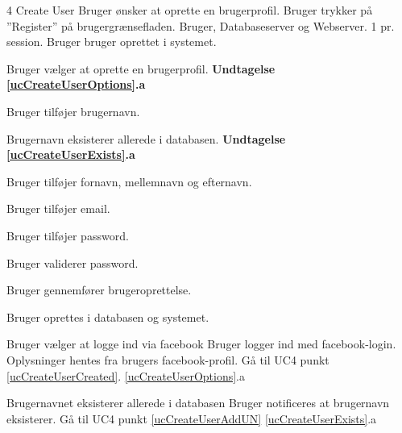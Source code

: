 
\uchead
	{4}
	{Create User}
	{Bruger ønsker at oprette en brugerprofil.}
	{Bruger trykker på ''Register'' på brugergrænsefladen.}
	{Bruger, Databaseserver og Webserver.}
	{}
	{1 pr. session.}
	{Bruger bruger oprettet i systemet.}

\item \label{ucCreateUserOptions} Bruger vælger at oprette en brugerprofil. \newline
\textbf{Undtagelse \ref{ucCreateUserOptions}.a}

\item \label{ucCreateUserAddUN} Bruger tilføjer brugernavn.

\item \label{ucCreateUserExists} Brugernavn eksisterer allerede i databasen. \newline
\textbf{Undtagelse \ref{ucCreateUserExists}.a}

\item Bruger tilføjer fornavn, mellemnavn og efternavn.

\item Bruger tilføjer email.

\item Bruger tilføjer password.

\item Bruger validerer password.

\item Bruger gennemfører brugeroprettelse.

\item \label{ucCreateUserCreated} Bruger oprettes i databasen og systemet.

\ucdescriptionend


\ucextension
	{Bruger vælger at logge ind via facebook}
	{Bruger logger ind med facebook-login. \newline
	\indent Oplysninger hentes fra brugers facebook-profil. \newline
	\indent Gå til UC4 punkt \ref{ucCreateUserCreated}.
	}
	{\ref{ucCreateUserOptions}.a}

	
	
\ucextension
	{Brugernavnet eksisterer allerede i databasen}
	{Bruger notificeres at brugernavn eksisterer.\newline
	Gå til UC4 punkt \ref{ucCreateUserAddUN}}
	{\ref{ucCreateUserExists}.a}
	
